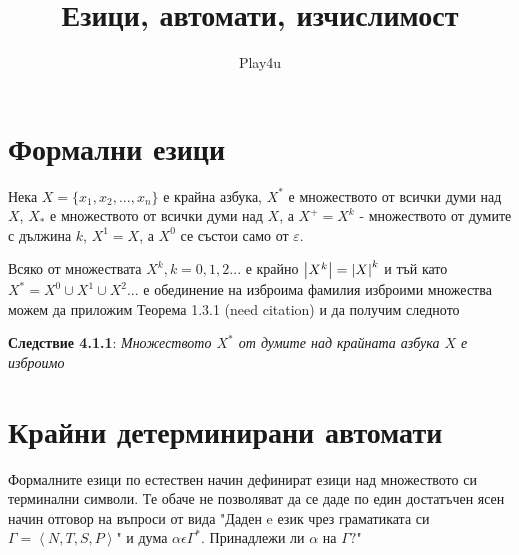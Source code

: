 \documentclass[11pt]{article} %
\title{Езици, автомати, изчислимост}
\author{Play4u}
\begin{document}
\maketitle

\newcommand{\lrangle}[1]{\left\langle #1 \right\rangle}

\newcommand{\belongsTo}{\in}
\newcommand{\notBelongsTo}{\centernot\in}
\newcommand{\kda}{A = <Q, X, q_{0}, \delta, F>}

\newcommand{\italicBold}[1]{\textbf{\emph{#1}}}
\newcommand{\definition}{\italicBold{Дефиниция:}}
\newcommand{\theorem}{\italicBold{Теорема:}}
\newcommand{\lemma}{\italicBold{Лема:}}
\newcommand{\proof}{\italicBold{Доказателство:}}

\newcommand{\curlies}[1]{\{#1\}}

\section{Формални езици}

Нека $X = \{x_1, x_2, ..., x_n\}$ е крайна азбука, $X^*$ е множеството от всички думи над $X$, $X_{*}$ е множеството от всички думи над $X$, а $X^{+} = X^{k}$ 
- множеството от думите с дължина 
$k$, $X^{1} = X$, а $X^{0}$ 
се състои само от $\varepsilon$. \par

Всяко от множествата $X^{k}, k = 0, 1, 2 ...$ е крайно $\abs{X^{k}} = \abs{X}^{k}$ и тъй като $X^{*} = X^{0} \cup X^{1} \cup X^{2}...$ е обединение на изброима фамилия изброими множества можем да приложим Теорема 1.3.1 (need citation) и да получим следното \par

\textbf{Следствие 4.1.1}: \emph{Множеството $X^{*}$ от думите над крайната азбука $X$ е изброимо} \par
   

\section{Крайни детерминирани автомати}
Формалните езици по естествен начин дефинират езици над множеството си терминални символи. Те обаче не позволяват да се даде по един достатъчен ясен начин отговор на въпроси от вида "Даден e език чрез граматиката си $\Gamma = \left\langle N, T, S, P \right\rangle$"
и дума $\alpha \epsilon \Gamma^*.$ Принадлежи ли $\alpha$ на $\Gamma?$" \par
\end{document}
